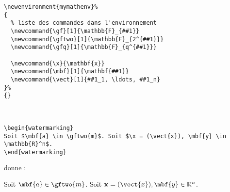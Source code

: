 \begin{verbatim}
\newenvironment{mymathenv}%
{
  % liste des commandes dans l'environnement
  \newcommand{\gf}[1]{\mathbb{F}_{##1}}
  \newcommand{\gftwo}[1]{\mathbb{F}_{2^{##1}}}
  \newcommand{\gfq}[1]{\mathbb{F}_{q^{##1}}}

  \newcommand{\x}{\mathbf{x}}
  \newcommand{\mbf}[1]{\mathbf{##1}}
  \newcommand{\vect}[1]{##1_1, \ldots, ##1_n}
}%
{}



\begin{watermarking}
Soit $\mbf{a} \in \gftwo{m}$. Soit $\x = (\vect{x}), \mbf{y} \in \mathbb{R}^n$.
\end{watermarking}
\end{verbatim}
donne :\\
\begin{watermarking}
Soit $\mbf{a} \in \gftwo{m}$. Soit $\x = (\vect{x}), \mbf{y} \in \mathbb{R}^n$.
\end{watermarking}